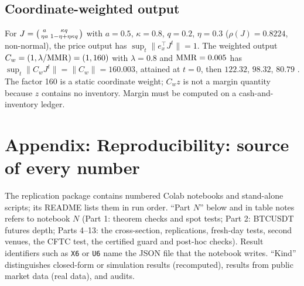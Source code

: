 \subsection{Coordinate-weighted output}\label{p1:app:coordw}
For $J=\begin{psmallmatrix}a&\kappa q\\ \eta a&1-\eta+\eta\kappa q\end{psmallmatrix}$ with $a=0.5$, $\kappa=0.8$, $q=0.2$, $\eta=0.3$ ($\rho(J)=0.8224$, non-normal), the price output has $\sup_t\|e_x^\top J^t\|=1$. The weighted output $C_w=(1,\lambda/{\rm MMR})=(1,160)$ with $\lambda=0.8$ and ${\rm MMR}=0.005$ has $\sup_t\|C_wJ^t\|=\|C_w\|=160.003$, attained at $t=0$, then $122.32$, $98.32$, $80.79$ . The factor 160 is a static coordinate weight; $C_wz$ is not a margin quantity because $z$ contains no inventory. Margin must be computed on a cash-and-inventory ledger.

\section{Appendix: Reproducibility: source of every number}\label{p1:app:repro}

The replication package contains numbered Colab notebooks and stand-alone scripts; its README lists them in run order. ``Part $N$'' below and in table notes refers to notebook $N$ (Part 1: theorem checks and spot tests; Part 2: BTCUSDT futures depth; Parts 4--13: the cross-section, replications, fresh-day tests, second venues, the CFTC test, the certified guard and post-hoc checks). Result identifiers such as \texttt{X6} or \texttt{U6} name the JSON file that the notebook writes. ``Kind'' distinguishes closed-form or simulation results (recomputed), results from public market data (real data), and audits.

